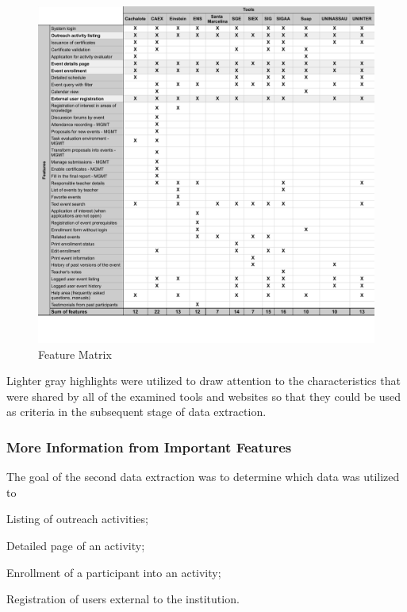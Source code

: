 \begin{figure}[!htb]
  \caption{Feature Matrix}\label{fig:gl-matrix}
  \begin{center}
    \includegraphics[width=16cm]{img/4-functionality-matrix.pdf}
  \end{center}
\end{figure}

Lighter gray highlights were utilized to draw attention to the characteristics that were shared by all of the examined tools and websites so that they could be used as criteria in the subsequent stage of data extraction.

\subsubsection{More Information from Important Features}\label{sec:gl-data-extraction-2}

The goal of the second data extraction was to determine which data was utilized to 
\begin{inparaenum}[(i)]
  \item Listing of outreach activities;
  \item Detailed page of an activity;
  \item Enrollment of a participant into an activity;
  \item Registration of users external to the institution.
\end{inparaenum}

